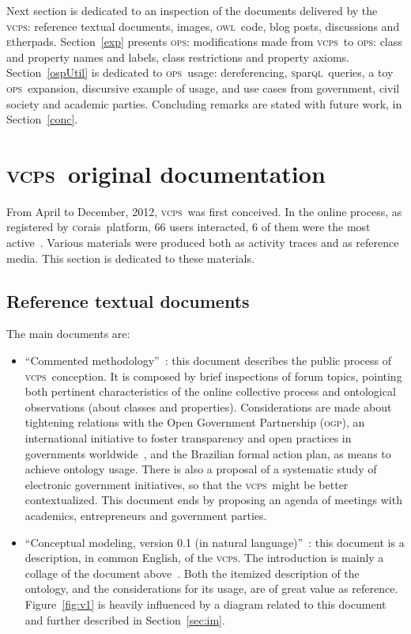 \documentclass[10pt,letterpaper]{article}
\newcommand{\ops}{\textsc{ops}}
\newcommand{\vcps}{\textsc{vcps}}
\newcommand{\owl}{\textsc{owl}}
\newcommand{\sparql}{\textsc{s}par\textsc{ql}}
\newcommand{\etherpad}{\textsc{e}therpad}
\newcommand{\ogp}{\textsc{ogp}}
\newcommand{\corais}{\textsc{c}orais}
\begin{document}
Next section is dedicated to an inspection of the documents delivered by the \vcps: reference textual documents, images, \owl\ code, blog posts, discussions and \etherpad s. Section~\ref{exp} presents \ops: modifications made from \vcps\ to \ops: class and property names and labels, class restrictions and property axioms. Section~\ref{ospUtil} is dedicated to \ops\ usage: dereferencing, \sparql\ queries, a toy \ops\ expansion, discursive example of usage, and use cases from government, civil society and academic parties. Concluding remarks are stated with future work, in Section~\ref{conc}. 


\section{\vcps\ original documentation}
From April to December, 2012, \vcps\ was first conceived. In the online process, as registered by \corais\ platform, 66 users interacted, 6 of them were the most active~\cite{metodologia}. Various materials were produced both as activity traces and as reference media. This section is dedicated to these materials.

\subsection{Reference textual documents}\label{refDocs}
The main documents are:
\begin{itemize}
    \item ``Commented methodology''~\cite{metodologia}: this document describes the public process of \vcps\ conception. It is composed by brief inspections of forum topics, pointing both pertinent characteristics of the online collective process and ontological observations (about classes and properties). Considerations are made about tightening relations with the Open Government Partnership (\ogp), an international initiative to foster transparency and open practices in governments worldwide~\cite{OGP}, and the Brazilian formal action plan, as means to achieve ontology usage. 
     There is also a proposal of a systematic study of electronic government initiatives, so that the \vcps\ might be better contextualized. This document ends by proposing an agenda of meetings with academics, entrepreneurs and government parties.
 \item ``Conceptual modeling, version 0.1 (in natural language)''~\cite{conceptualMod}: this document is a description, in common English, of the \vcps. The introduction is mainly a collage of the document above~\cite{metodologia}. Both the itemized description of the ontology, and the considerations for its usage, are of great value as reference. Figure~\ref{fig:v1} is heavily influenced by a diagram related to this document and further described in Section~\ref{sec:im}.
\end{itemize}
\end{document}
